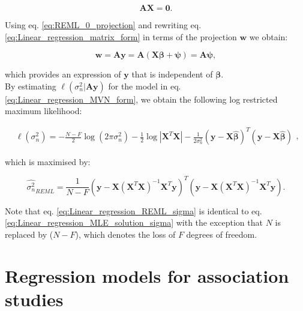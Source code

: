 \begin{equation}\label{eq:REML_0_projection}
    \mathbf{A}\mathbf{X} = \mathbf{0}.
\end{equation}

Using eq. \eqref{eq:REML_0_projection} and rewriting eq. \eqref{eq:Linear_regression_matrix_form} in terms of the projection $\mathbf{w}$ we obtain:

\begin{equation}\label{eq:REML_w_projection}
    \mathbf{w} = \mathbf{A}\mathbf{y} = \mathbf{A}(\mathbf{X}\boldsymbol{\beta} + \boldsymbol{\psi}) = \mathbf{A}\boldsymbol{\psi},
\end{equation}

which provides an expression of $\mathbf{y}$ that is independent of $\boldsymbol{\beta}$.\\

By estimating $\ell(\sigma_n^2 | \mathbf{A}\mathbf{y} )$ for the model in eq. \eqref{eq:Linear_regression_MVN_form}, we obtain the following log restricted maximum likelihood:

\begin{equation} \label{eq:Linear_regression_log_restricted_likelihood}
\begin{split}
\ell(\sigma_n^2) = -\frac{N-F}{2}\log (2\pi\sigma_n^2) - \frac{1}{2}\log |\mathbf{X}^T\mathbf{X}| 
- \frac{1}{2\sigma_n^2}(\mathbf{y}-\mathbf{X}\hat{\boldsymbol{\beta}})^T(\mathbf{y}-\mathbf{X}\hat{\boldsymbol{\beta}})  
\end{split},
\end{equation}

which is maximised by:

\begin{equation}\label{eq:Linear_regression_REML_sigma}
\hat{\sigma_n^2}_{REML} =  \frac{1}{N-F}(\mathbf{y}-\mathbf{X}(\mathbf{X}^T\mathbf{X})^{-1}\mathbf{X}^T\mathbf{y})^T(\mathbf{y}-\mathbf{X}(\mathbf{X}^T\mathbf{X})^{-1}\mathbf{X}^T\mathbf{y}).
\end{equation}

Note that eq. \eqref{eq:Linear_regression_REML_sigma} is identical to eq. \eqref{eq:Linear_regression_MLE_solution_sigma} with the exception that $N$ is replaced by ($N-F$), which denotes the loss of $F$ degrees of freedom.

\newpage


\section{Regression models for association studies}
\label{sec:linear_models_genetics}

